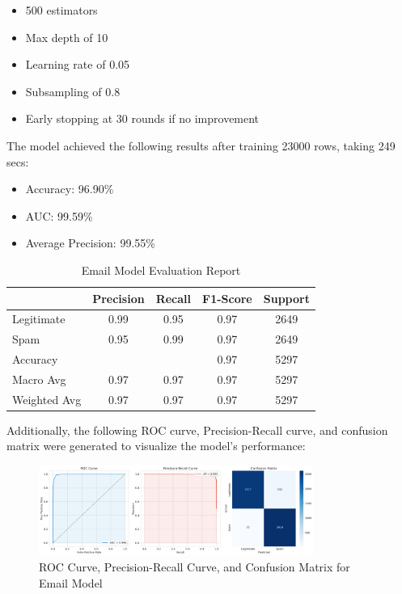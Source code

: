 \documentclass{article}
\begin{document}
\begin{itemize}
    \item 500 estimators
    \item Max depth of 10
    \item Learning rate of 0.05
    \item Subsampling of 0.8
    \item Early stopping at 30 rounds if no improvement
\end{itemize}

\noindent
The model achieved the following results after training 23000 rows, taking 249 secs:

\begin{itemize}
    \item Accuracy: 96.90\%
    \item AUC: 99.59\%
    \item Average Precision: 99.55\%
\end{itemize}

\begin{table}[htbp]
    \centering
    \caption{Email Model Evaluation Report}
    \begin{tabular}{l c c c c}
    \toprule
     & Precision & Recall & F1-Score & Support \\
    \midrule
    Legitimate & 0.99 & 0.95 & 0.97 & 2649 \\
    Spam & 0.95 & 0.99 & 0.97 & 2649 \\
    \midrule
    Accuracy  & & & 0.97 & 5297 \\
    Macro Avg & 0.97 & 0.97 & 0.97 & 5297 \\
    Weighted Avg & 0.97 & 0.97 & 0.97 & 5297 \\
    \bottomrule
    \end{tabular}
    \label{tab:xgboost_evaluation}
\end{table}

\noindent
Additionally, the following ROC curve, Precision-Recall curve, and confusion matrix were generated to visualize the model's performance:
\begin{figure}[htbp]
    \centering
    \includegraphics[width=0.8\textwidth]{../analysis/email/email_model_performance.png}
    \caption{ROC Curve, Precision-Recall Curve, and Confusion Matrix for Email Model}
    \label{fig:roc_curve_4}
\end{figure}
\end{document}
